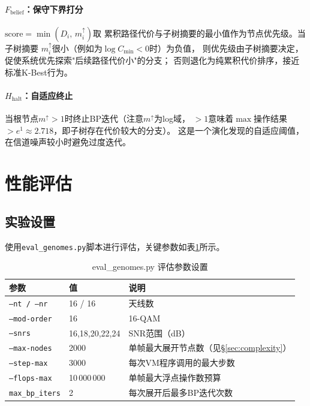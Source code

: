 \documentclass[12pt, a4paper]{ctexart}
\begin{document}
\paragraph{$F_{\mathrm{belief}}$：保守下界打分}
$\mathrm{score}=\min(D_i,\,m^\uparrow_i)$取
累积路径代价与子树摘要的最小值作为节点优先级。当子树摘要
$m^\uparrow_i$很小（例如为$\log C_{\min}<0$时）为负值，
则优先级由子树摘要决定，促使系统优先探索"后续路径代价小"的分支；
否则退化为纯累积代价排序，接近标准K-Best行为。

\paragraph{$H_{\mathrm{halt}}$：自适应终止}
当根节点$m^\uparrow>1$时终止BP迭代（注意$m^\uparrow$为log域，
$>1$意味着$\max$操作结果$>e^1\approx2.718$，即子树存在代价较大的分支）。
这是一个演化发现的自适应阈值，在信道噪声较小时避免过度迭代。


\section{性能评估}

\subsection{实验设置}

使用\texttt{eval\_genomes.py}脚本进行评估，关键参数如表\ref{tab:eval_params}所示。

\begin{table}[H]
  \centering
  \caption{eval\_genomes.py 评估参数设置}
  \label{tab:eval_params}
  \begin{tabular}{lll}
    \toprule
    参数 & 值 & 说明 \\
    \midrule
    \texttt{--nt / --nr}    & 16 / 16  & 天线数 \\
    \texttt{--mod-order}    & 16       & 16-QAM \\
    \texttt{--snrs}         & 16,18,20,22,24 & SNR范围（dB） \\
    \texttt{--max-nodes}    & 2000     & 单帧最大展开节点数（见\S\ref{sec:complexity}） \\
    \texttt{--step-max}     & 3000     & 每次VM程序调用的最大步数 \\
    \texttt{--flops-max}    & 10\,000\,000 & 单帧最大浮点操作数预算 \\
    \texttt{max\_bp\_iters} & 2        & 每次展开后最多BP迭代次数 \\
    \bottomrule
  \end{tabular}
\end{table}
\end{document}
